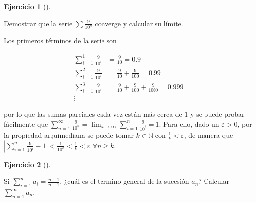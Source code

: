 \documentclass[
  spanish,
  a4paper,
]{scrreport}
\theoremstyle{definition}
\newtheorem{exercise}{Ejercicio}[chapter]
\theoremstyle{remark}
\begin{document}
\begin{exercise}[]\protect\hypertarget{exr-números-decimales-series}{}\label{exr-números-decimales-series}

Demostrar que la serie \(\sum \frac{9}{10^n}\) converge y calcular su
límite.

\end{exercise}

\begin{tcolorbox}[enhanced jigsaw, arc=.35mm, bottomrule=.15mm, bottomtitle=1mm, breakable, colback=white, colbacktitle=quarto-callout-tip-color!10!white, colframe=quarto-callout-tip-color-frame, coltitle=black, left=2mm, leftrule=.75mm, opacityback=0, opacitybacktitle=0.6, rightrule=.15mm, title=\textcolor{quarto-callout-tip-color}{\faLightbulb}\hspace{0.5em}{Solución}, titlerule=0mm, toprule=.15mm, toptitle=1mm]

Los primeros términos de la serie son

\begin{align*}
\sum_{i=1}^1 \frac{9}{10^i} &= \frac{9}{10} = 0.9\\ 
\sum_{i=1}^2 \frac{9}{10^i} &= \frac{9}{10} + \frac{9}{100} = 0.99\\ 
\sum_{i=1}^3 \frac{9}{10^i} &= \frac{9}{10} + \frac{9}{100} + \frac{9}{1000} = 0.999\\ 
\vdots
\end{align*}

por lo que las sumas parciales cada vez están más cerca de \(1\) y se
puede probar fácilmente que
\(\sum_{n=1}^\infty \frac{9}{10^n} = \lim_{n\to\infty} \sum_{i=1}^n \frac{9}{10^i} = 1\).
Para ello, dado un \(\varepsilon>0\), por la propiedad arquimediana se
puede tomar \(k\in\mathbb{N}\) con \(\frac{1}{k}<\varepsilon\), de
manera que
\(|\sum_{i=1}^n \frac{9}{10^i} -1|<\frac{1}{10^k}<\frac{1}{k}<\varepsilon\)
\(\forall n\geq k\).

\end{tcolorbox}

\begin{exercise}[]\protect\hypertarget{exr-sumas-parciales}{}\label{exr-sumas-parciales}

Si \(\sum_{i=1}^n a_i=\frac{n-1}{n+1}\), ¿cuál es el término general de
la sucesión \(a_n\)? Calcular \(\sum_{n=1}^\infty a_n\).

\end{exercise}
\end{document}

